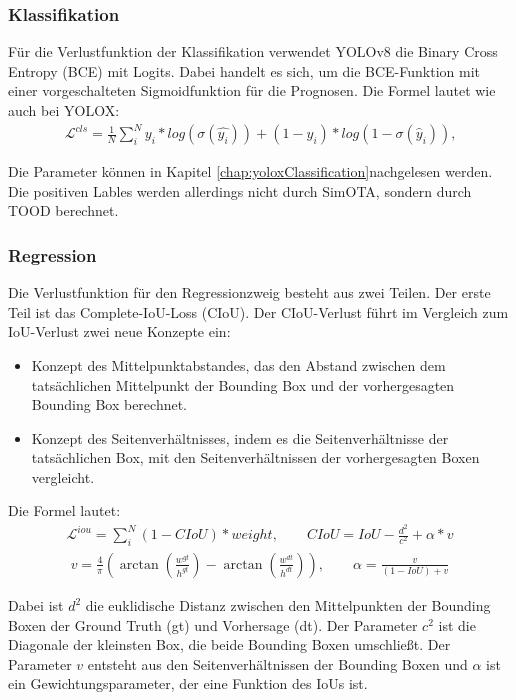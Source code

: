 \subsubsection{Klassifikation} 
Für die Verlustfunktion der Klassifikation verwendet YOLOv8 die Binary Cross Entropy (BCE) mit Logits. Dabei handelt es sich, um die BCE-Funktion mit einer vorgeschalteten Sigmoidfunktion für die Prognosen.
Die Formel lautet wie auch bei YOLOX:
\begin{align}
	\mathcal{L}^{cls}=\frac{1}{N}\sum_{i}^{N}y_i*log(\sigma(\hat{y_i}))+(1-y_i)*log(1-\sigma(\hat{y}_i)) \text{,}
\end{align}

Die Parameter können in Kapitel \ref{chap:yoloxClassification}nachgelesen werden. Die positiven Lables werden allerdings nicht durch SimOTA, sondern durch TOOD berechnet.

\subsubsection{Regression} 
Die Verlustfunktion für den Regressionzweig besteht aus zwei Teilen. Der erste Teil ist das Complete-IoU-Loss (CIoU). Der CIoU-Verlust führt im Vergleich zum IoU-Verlust zwei neue Konzepte ein:
\begin{itemize}
\item Konzept des Mittelpunktabstandes, das den Abstand zwischen dem tatsächlichen Mittelpunkt der Bounding Box und der vorhergesagten Bounding Box berechnet.
\item Konzept des Seitenverhältnisses, indem es die Seitenverhältnisse der tatsächlichen Box, mit den Seitenverhältnissen der vorhergesagten Boxen vergleicht.
\end{itemize}

Die Formel lautet:
\begin{align}
	\mathcal{L}^{iou}=\sum_{i}^{N}(1-CIoU)*weight, \qquad 	CIoU = IoU - \frac{d^2}{c^2}+\alpha*v
\end{align}
\begin{align}
	v=\frac{4}{\pi}(\arctan(\frac{w^{gt}}{h^{gt}})-\arctan(\frac{w^{dt}}{h^{dt}})), \qquad \alpha=\frac{v}{(1-IoU)+v}
\end{align}

Dabei ist $d^2$ die euklidische Distanz zwischen den Mittelpunkten der Bounding Boxen der Ground Truth (gt) und Vorhersage (dt). Der Parameter $c^2$ ist die Diagonale der kleinsten Box, die beide Bounding Boxen umschließt. Der Parameter $v$ entsteht aus den Seitenverhältnissen der Bounding Boxen und $\alpha$ ist ein Gewichtungsparameter, der eine Funktion des IoUs ist. \cite{ciouLoss}

